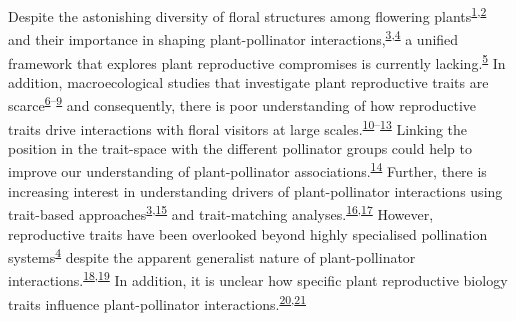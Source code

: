 \documentclass[
  12pt,
  a4paper,
]{article}
\begin{document}
\doublespacing
\vspace{5mm}
\normalsize

Despite the astonishing diversity of floral structures among flowering plants\textsuperscript{\protect\hyperlink{ref-barrett2002}{1},\protect\hyperlink{ref-schiestl2013}{2}} and their importance in shaping plant-pollinator interactions,\textsuperscript{\protect\hyperlink{ref-fenster2004}{3},\protect\hyperlink{ref-dellinger2020}{4}} a unified framework that explores plant reproductive compromises is currently lacking.\textsuperscript{\protect\hyperlink{ref-roddy2021}{5}} In addition, macroecological studies that investigate plant reproductive traits are scarce\textsuperscript{\protect\hyperlink{ref-baude2016}{6}--\protect\hyperlink{ref-moeller2017}{9}} and consequently, there is poor understanding of how reproductive traits drive interactions with floral visitors at large scales.\textsuperscript{\protect\hyperlink{ref-sargent2008}{10}--\protect\hyperlink{ref-ruger2018}{13}} Linking the position in the trait-space with the different pollinator groups could help to improve our understanding of plant-pollinator associations.\textsuperscript{\protect\hyperlink{ref-dehling2016}{14}} Further, there is increasing interest in understanding drivers of plant-pollinator interactions using trait-based approaches\textsuperscript{\protect\hyperlink{ref-fenster2004}{3},\protect\hyperlink{ref-rosas2014}{15}} and trait-matching analyses.\textsuperscript{\protect\hyperlink{ref-stang2009}{16},\protect\hyperlink{ref-bartomeus2016}{17}} However, reproductive traits have been overlooked beyond highly specialised pollination systems\textsuperscript{\protect\hyperlink{ref-dellinger2020}{4}} despite the apparent generalist nature of plant-pollinator interactions.\textsuperscript{\protect\hyperlink{ref-waser1996}{18},\protect\hyperlink{ref-olesen2002}{19}} In addition, it is unclear how specific plant reproductive biology traits influence plant-pollinator interactions.\textsuperscript{\protect\hyperlink{ref-tur2013}{20},\protect\hyperlink{ref-devaux2014}{21}}
\end{document}
